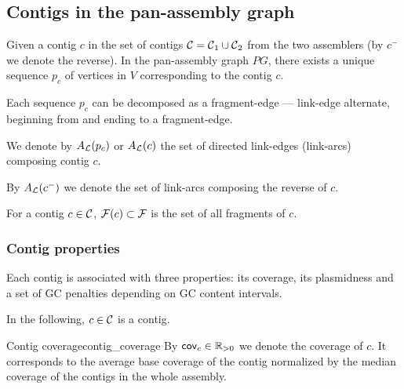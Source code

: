 \subsection{Contigs in the pan-assembly graph}

Given a contig \(c\) in the set of contigs \(\mathcal{C}{} = \mathcal{C}{}_1 \cup \mathcal{C}{}_2\) from the two assemblers (by \(c^-\) we denote the reverse).
In the pan-assembly graph \(PG\), there exists a unique sequence \(p_c\) of vertices in \(V\) corresponding to the contig \(c\).

\begin{notebox}
  Each sequence \(p_c\) can be decomposed as a fragment-edge --- link-edge alternate, beginning from and ending to a fragment-edge.
\end{notebox}

We denote by \(A_{\mathcal{L}}{}(p_c)\) or \(A_{\mathcal{L}}{}(c)\) the set of directed link-edges (link-arcs) composing contig \(c\).

\begin{notebox}
  By \(A_{\mathcal{L}}{}(c^-)\) we denote the set of link-arcs composing the reverse of \(c\).
\end{notebox}

For a contig \(c \in \mathcal{C}{}\), \(\mathcal{F}{}(c) \subset \mathcal{F}{}\) is the set of all fragments of \(c\).

\subsubsection{Contig properties}

Each contig is associated with three properties: its coverage, its plasmidness and a set of GC penalties depending on GC content intervals.

In the following, \(c \in \mathcal{C}{}\) is a contig.

\begin{definition}{Contig coverage}{contig_coverage}
  By \(\mathsf{cov}_{c} \in \mathbb{R}_{>0}\) we denote the coverage of \(c\).
  It corresponds to the average base coverage of the contig normalized by the median coverage of the contigs in the whole assembly.
\end{definition}

